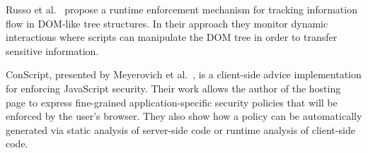 Russo et al.~\cite{1813092} propose a runtime enforcement mechanism for tracking information flow in DOM-like tree structures.
In their approach they monitor dynamic interactions where scripts can manipulate the DOM tree in order to transfer sensitive information.

ConScript, presented by Meyerovich et al.~\cite{5504806}, is a client-side advice implementation for enforcing JavaScript security.
Their work allows the author of the hosting page to express fine-grained application-specific security policies that will be enforced by the user's browser.
They also show how a policy can be automatically generated via static analysis of server-side code or runtime analysis of client-side code.




